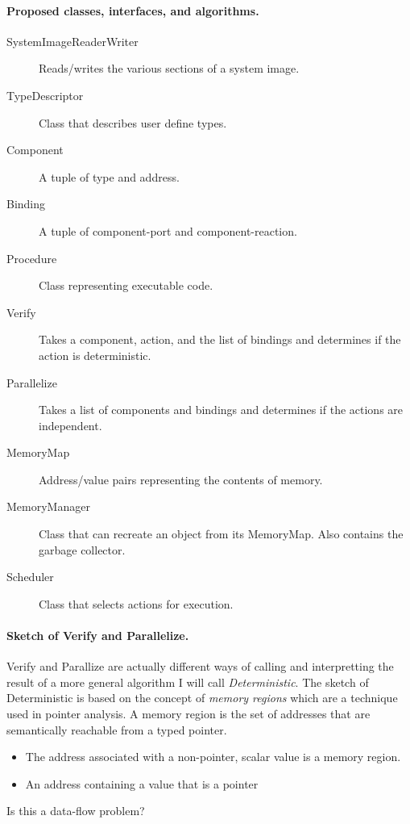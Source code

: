 \paragraph{Proposed classes, interfaces, and algorithms.}
\begin{description}
\item[SystemImageReaderWriter] Reads/writes the various sections of a system image.
\item[TypeDescriptor] Class that describes user define types.
\item[Component] A tuple of type and address.
\item[Binding] A tuple of component-port and component-reaction.
\item[Procedure] Class representing executable code.
\item[Verify] Takes a component, action, and the list of bindings and determines if the action is deterministic.
\item[Parallelize] Takes a list of components and bindings and determines if the actions are independent.
\item[MemoryMap] Address/value pairs representing the contents of memory.
\item[MemoryManager] Class that can recreate an object from its MemoryMap.  Also contains the garbage collector.
\item[Scheduler] Class that selects actions for execution.
\end{description}

\paragraph{Sketch of Verify and Parallelize.}
Verify and Parallize are actually different ways of calling and interpretting the result of a more general algorithm I will call \emph{Deterministic}.
The sketch of Deterministic is based on the concept of \emph{memory regions} which are a technique used in pointer analysis.
A memory region is the set of addresses that are semantically reachable from a typed pointer.

\begin{itemize}
\item The address associated with a non-pointer, scalar value is a memory region.

\item An address containing a value that is a pointer
\end{itemize}

Is this a data-flow problem?

